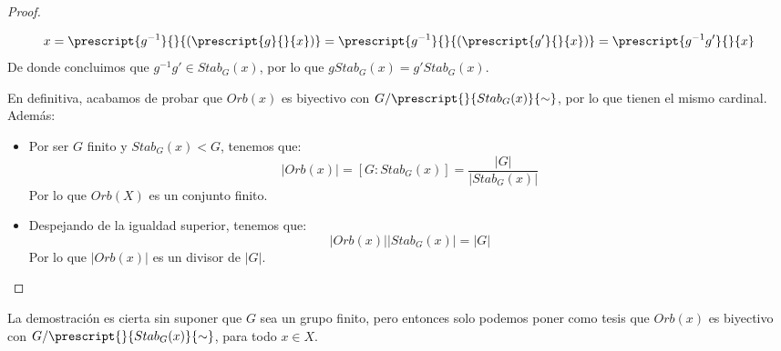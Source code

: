 \begin{prop}
\begin{proof}
\begin{itemize}
               \begin{equation*}
                   x = \prescript{g^{-1}}{}{(\prescript{g}{}{x})} = \prescript{g^{-1}}{}{(\prescript{g'}{}{x})} = \prescript{g^{-1}g'}{}{x}
               \end{equation*}
               De donde concluimos que $g^{-1}g'\in Stab_G(x)$, por lo que $gStab_G(x) = g'Stab_G(x)$.
       \end{itemize}
       En definitiva, acabamos de probar que $Orb(x)$ es biyectivo con $G/\prescript{}{Stab_G(x)}{\sim}$, por lo que tienen el mismo cardinal. Además:
       \begin{itemize}
           \item Por ser $G$ finito y $Stab_G(x)<G$, tenemos que:
               \begin{equation*}
                   |Orb(x)| = [G:Stab_G(x)] = \dfrac{|G|}{|Stab_G(x)|}
               \end{equation*}
               Por lo que $Orb(X)$ es un conjunto finito.
           \item Despejando de la igualdad superior, tenemos que:
               \begin{equation*}
                   |Orb(x)||Stab_G(x)| = |G|
               \end{equation*}
               Por lo que $|Orb(x)|$ es un divisor de $|G|$.
       \end{itemize}
   \end{proof}
\end{prop}

\begin{observacion}
La demostración es cierta sin suponer que $G$ sea un grupo finito, pero entonces solo podemos poner como tesis que $Orb(x)$ es biyectivo con $G/\prescript{}{Stab_G(x)}{\sim}$, para todo $x\in X$.
\end{observacion}

